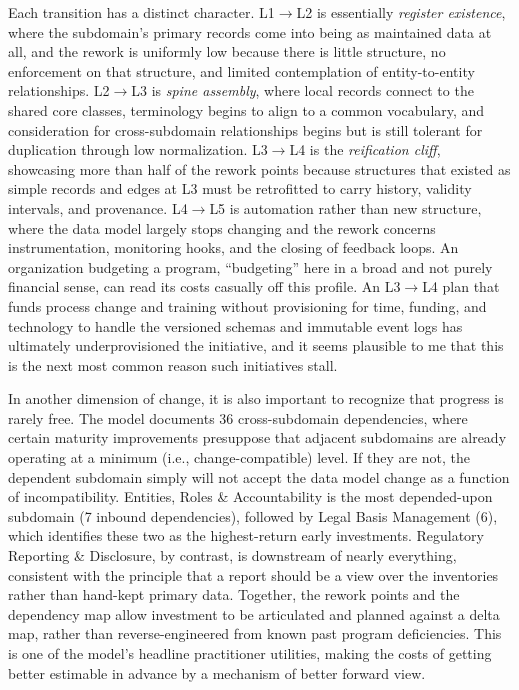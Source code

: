 \documentclass[10pt,letterpaper,twocolumn,twoside]{rho-class/rho}
\begin{document}
Each transition has a distinct character. L1$\to$L2 is essentially \emph{register existence}, where the subdomain's primary records come into being as maintained data at all, and the rework is uniformly low because there is little structure, no enforcement on that structure, and limited contemplation of entity-to-entity relationships. L2$\to$L3 is \emph{spine assembly}, where local records connect to the shared core classes, terminology begins to align to a common vocabulary, and consideration for cross-subdomain relationships begins but is still tolerant for duplication through low normalization. L3$\to$L4 is the \emph{reification cliff}, showcasing more than half of the rework points because structures that existed as simple records and edges at L3 must be retrofitted to carry history, validity intervals, and provenance. L4$\to$L5 is automation rather than new structure, where the data model largely stops changing and the rework concerns instrumentation, monitoring hooks, and the closing of feedback loops. An organization budgeting a program, ``budgeting'' here in a broad and not purely financial sense, can read its costs casually off this profile. An L3$\to$L4 plan that funds process change and training without provisioning for time, funding, and technology to handle the versioned schemas and immutable event logs has ultimately underprovisioned the initiative, and it seems plausible to me that this is the next most common reason such initiatives stall.

In another dimension of change, it is also important to recognize that progress is rarely free. The model documents 36 cross-subdomain dependencies, where certain maturity improvements presuppose that adjacent subdomains are already operating at a minimum (i.e., change-compatible) level. If they are not, the dependent subdomain simply will not accept the data model change as a function of incompatibility. Entities, Roles \& Accountability is the most depended-upon subdomain (7 inbound dependencies), followed by Legal Basis Management (6), which identifies these two as the highest-return early investments. Regulatory Reporting \& Disclosure, by contrast, is downstream of nearly everything, consistent with the principle that a report should be a view over the inventories rather than hand-kept primary data. Together, the rework points and the dependency map allow investment to be articulated and planned against a delta map, rather than reverse-engineered from known past program deficiencies. This is one of the model's headline practitioner utilities, making the costs of getting better estimable in advance by a mechanism of better forward view.
\end{document}
